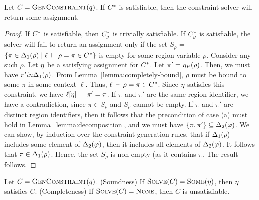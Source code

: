 \begin{theorem}
\label{thm:constraint-solver-completeness}
Let $C = \textsc{GenConstraint}(q)$.
If ${C}^*$ is satisfiable, then the constraint solver will return some assignment.
\end{theorem}

\begin{proof}
If ${C}^*$ is satisfiable, then ${C}^*_g$ is trivially satisfiable.
If ${C}^*_g$ is satisfiable, the solver will fail to return an assignment only if the set $S_\rho$ = 
$\{ \pi \in {\Delta_1}(\rho) \; | \; \ell\,\vdash\,\rho = \pi \in {C}^* \}$ is empty for some region variable $\rho$.
Consider any such $\rho$.
Let $\eta$ be a satisfying assignment for ${C}^*$.
Let $\pi' = \eta_P(\rho)$. Then, we must have $\pi' in {\Delta_1}(\rho)$.
From Lemma~\ref{lemma:completely-bound}, $\rho$ must be bound to some $\pi$ in some context $\ell$.
Thus, $\ell\,\vdash\,\rho = \pi \in {C}^*$.
Since $\eta$ satisfies this constraint, we have $\ell[\eta]\,\vdash\,\pi' = \pi$.
If $\pi$ and $\pi'$ are the same region identifier, we have a contradiction, since
$\pi \in S_\rho$ and $S_\rho$ cannot be empty.
If $\pi$ and $\pi'$ are distinct region identifiers, then it follows that the precondition of case (a) must hold
in Lemma~\ref{lemma:decomposition}, and we must have $\{ \pi, \pi' \} \subseteq {\Delta_2}(\varphi)$.
We can show, by induction over the constraint-generation rules, that if ${\Delta_1}(\rho)$ includes
some element of ${\Delta_2}(\varphi)$, then it includes all elements of ${\Delta_2}(\varphi)$.
It follows that $\pi \in {\Delta_1}(\rho)$. Hence, the set $S_\rho$ is non-empty (as it contains $\pi$.
The result follows.
\end{proof}

\begin{theorem}
\label{thm:constraint-solver-sc}
Let $C = \textsc{GenConstraint}(q)$.
(Soundness) If $\textsc{Solve}(C) = \textsc{Some}(\eta)$, then $\eta$ satisfies $C$.
(Completeness) If $\textsc{Solve}(C) = \textsc{None}$, then $C$ is unsatisfiable.
\end{theorem}

